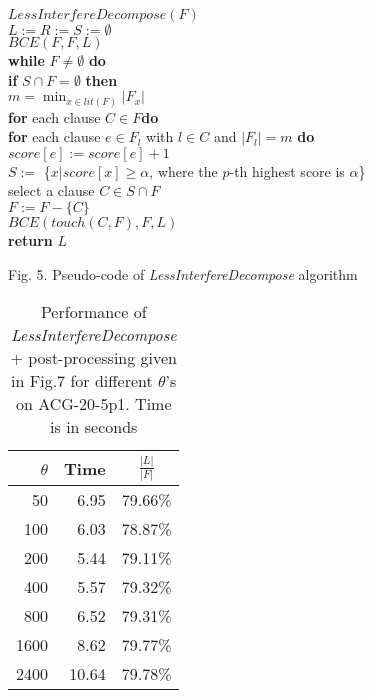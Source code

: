 \documentclass{llncs}
\begin{document}
\begin{flushleft}
\begin{sf}
\begin{footnotesize}

\hskip 12mm $LessInterfereDecompose(F)$\\
\hskip 16mm $ L := R := S := \emptyset $\\
\hskip 16mm $BCE(F,F,L)$\\
\hskip 16mm {\bf while } $ F \neq \emptyset $ {\bf do}\\
\hskip 20mm    {\bf if } $ S \cap F = \emptyset $ {\bf then} \\
\hskip 25mm     $ m = \min_{x \in lit(F)} |F_x|$\\
\hskip 25mm        {\bf for } each clause $ C \in F ${\bf do}\\
\hskip 28mm           {\bf for } each clause $e \in F_l$ with $ l \in C $ and $|F_l|=m$ {\bf do}\\
\hskip 32mm              $ score[e] := score[e]+1$\\
\hskip 25mm         $S :=$ \{$x | score[x] \geq \alpha$, where the $p$-th highest score is $\alpha$\}\\
\hskip 20mm    select a clause $C \in S \cap F $\\
\hskip 20mm    $F := F - \{C\}$\\
\hskip 20mm    $BCE(touch(C, F),F, L)$\\
\hskip 16mm {\bf return} $L$

\vspace{1em} \hskip 8mm \textrm{Fig. 5. Pseudo-code of
\emph{LessInterfereDecompose} algorithm}
\end{footnotesize}
\end{sf}
\end{flushleft}

\begin{table}
\caption{ Performance of \emph{LessInterfereDecompose} +
post-processing given in Fig.7 for different $\theta$'s on
ACG-20-5p1. Time is in seconds}

\begin{center}
\renewcommand{\arraystretch}{0.95}
\setlength\tabcolsep{4pt}
\begin{tabular}{|r|r|c|}
\hline  \hline \ $\theta$ & Time & $\frac{|L|}{|F|}$ \\
 \hline
50  & 6.95 &  79.66\% \\
100 & 6.03 &  78.87\% \\
200 & 5.44 &   79.11\% \\
400 & 5.57 &   79.32\% \\
800 & 6.52 &  79.31\% \\
1600 &   8.62  &  79.77\% \\
2400 &   10.64  & 79.78\% \\

 \hline
\end{tabular}
\end{center}
\end{table}
\end{document}
